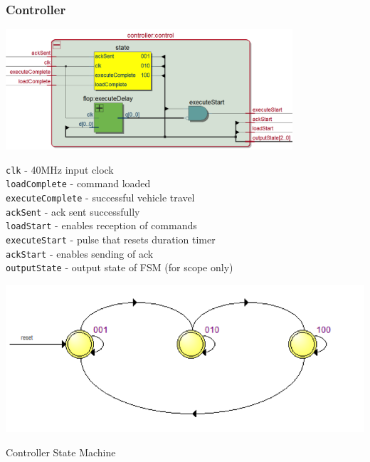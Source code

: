 \documentclass[12pt]{article}
\begin{document}
\subsubsection{Controller}
\begin{center}
\includegraphics[width=0.8\textwidth]{controller}
\end{center}
\verb.clk. - 40MHz input clock 
\\ \verb.loadComplete. - command loaded
\\ \verb.executeComplete. - successful vehicle travel
\\ \verb.ackSent. - ack sent successfully
\\ \verb.loadStart. - enables reception of commands
\\ \verb.executeStart. - pulse that resets duration timer
\\ \verb.ackStart. - enables sending of ack
\\ \verb.outputState. - output state of FSM (for scope only)

\begin{center}
\includegraphics{states}

Controller State Machine
\end{center}




\end{document}
